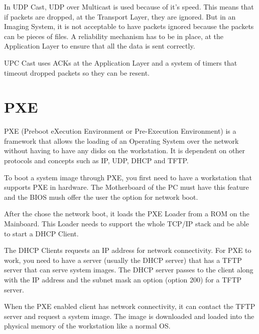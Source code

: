 In UDP Cast, UDP over Multicast is used because of it's speed. This means
that if packets are dropped, at the Transport Layer, they are ignored. But
in an Imaging System, it is not acceptable to have packets ignored because
the packets can be pieces of files. A reliability mechanism has to be in
place, at the Application Layer to ensure that all the data is sent
correctly.

UPC Cast uses ACKs at the Application Layer and a system of timers that
timeout dropped packets so they can be resent.


\section{PXE}


PXE (Preboot eXecution Environment or Pre-Execution
Environment)\cite{wiki:pxe} is a
framework that allows the loading of an Operating System over the network
without having to have any disks on the workstation. It is dependent on
other protocols and concepts such as \ac{IP}, \ac{UDP}, \ac{DHCP} and
\ac{TFTP}.

To boot a system image through \ac{PXE}, you first need to have a workstation
that supports \ac{PXE} in hardware. The Motherboard of the PC must have this
feature and the \ac{BIOS} mush offer the user the option for network boot.

After the chose the network boot, it loads the \ac{PXE} Loader from a ROM on the
Mainboard. This Loader needs to support the whole TCP/IP stack and be able
to start a \ac{DHCP} Client.

The \ac{DHCP} Clients requests an IP address for network connectivity.
For \ac{PXE}
to work, you need to have a server (usually the \ac{DHCP} server) that has a
\ac{TFTP} server that can serve system images. The \ac{DHCP} server passes to the
client along with the IP address and the subnet mask an option (option 200)
for a \ac{TFTP} server.

When the \ac{PXE} enabled client has network connectivity, it can contact the
\ac{TFTP} server and request a system image. The image is downloaded and loaded
into the physical memory of the workstation like a normal \ac{OS}.
